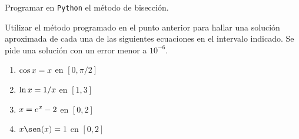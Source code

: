 \item Programar en \verb|Python| el método de bisección.

\item Utilizar el método programado en el punto anterior para hallar una solución aproximada de cada una de las siguientes ecuaciones en el intervalo indicado. Se pide una solución con un error menor a $10^{-6}$.
\begin{multicols}{2}
    \begin{enumerate}
        \item $\displaystyle \cos x = x$ en $[0,\pi/2]$
        \item $\displaystyle \ln x = 1/x$ en $[1,3]$
        \item $\displaystyle x=e^x-2$ en $[0,2]$
        \item $\D x\sen(x)=1$ en $[0,2]$
    \end{enumerate}
\end{multicols}
